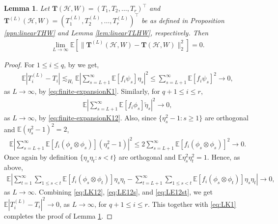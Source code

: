 \documentclass[11pt,reqno]{amsart}
\numberwithin{equation}{section}
\newcommand{\cH}{{\mathcal H}}
\newtheorem{lemma}{Lemma}[section]
\theoremstyle{definition}
\begin{document}
\begin{lemma}\label{lemma:Z_N-convg} 
Let $\bm T(\cH, W) = (T_1, T_2, \ldots, T_r)^\top$ and $\bm T^{(L)}(\cH, W) =  (T_1^{(L)}, T_2^{(L)}, \ldots, T_r^{(L)})^\top$ be as defined in Proposition \ref{ppn:linearTHW} and Lemma \ref{lem:linearTLHW}, respectively. Then 
\begin{align*}
    \lim_{L \rightarrow \infty} \mathbb E \left[ \| \bm T^{(L)}(\cH, W) - \bm T(\cH, W) \|_2^2 \right] = 0. 
\end{align*}
\end{lemma} 

\begin{proof} 

For $1\leq i\leq q$, by \cite[Lemma 8]{laxfunctional} we get,
\begin{align}\label{eq:LK1}
\mathbb E |T_i^{(L)} - T_i| \lesssim_{H_i} \mathbb E \left|\sum_{s = L+1}^{\infty}\mathbb{E}\left[f_{i}\psi_{s}\right] \eta_{s}\right|^{2} \leq \sum_{s=L+1}^\infty \mathbb{E}\left[f_{i}\psi_{s}\right]^2 \rightarrow 0 , 
\end{align}
as $L \rightarrow \infty$, by \eqref{eq:finite-expansionK1}. Similarly, for $q+1\leq i\leq r$,
\begin{align}\label{eq:LK12}
    \mathbb E \left|\sum_{s = L+1}^\infty \mathbb{E}\left[f_{i}\phi_{s}\right] \tilde{\eta}_{s} \right|^{2} \rightarrow 0 , 
\end{align} 
as $L \rightarrow \infty$, by \eqref{eq:finite-expansionK12}. Also,
since $\{\eta_{s}^2-1: s\geq 1\}$ are orthogonal and $\mathbb{E}(\eta_{s}^2-1)^2=2$,
\begin{align}\label{eq:LE12s}
  \mathbb E \left|\sum_{ s = L+1}^\infty \mathbb{E}\left[f_{i}(\phi_{s}\otimes\phi_{s})\right]\left(\eta_{s}^2 - 1\right)\right|^2 \leq  2\sum_{s= L+1}^\infty \mathbb{E}\left[f_{i}(\phi_{s}\otimes\phi_{s})\right]^2 \rightarrow 0 . 
\end{align} 
Once again by definition $\{\eta_{s}\eta_{t}: s < t\}$ are orthogonal and $\mathbb{E}\eta_{s}^2\eta_{t}^2=1$. Hence, as above, 
\begin{align}\label{eq:LE12st}
    \mathbb E \left| \sum_{t=1}^\infty \sum_{1 \leq s < t }\mathbb{E}\left[f_{i}(\phi_{s}\otimes\phi_{t})\right]\eta_{s}\eta_{t}  -  \sum_{t = L+1}^\infty \sum_{1 \leq s < t} \mathbb{E}\left[f_{i}(\phi_{s}\otimes\phi_{t})\right]\eta_{s}\eta_{t} \right| \rightarrow 0 , 
\end{align} 
as $L \rightarrow \infty$. Combining \eqref{eq:LK12}, \eqref{eq:LE12s}, and \eqref{eq:LE12st}, we get $\mathbb E |T_i^{(L)} - T_i|^2 \rightarrow 0$, as $L \rightarrow \infty$, for $q+1 \leq i \leq r$. This together with \eqref{eq:LK1} completes the proof of Lemma \ref{lemma:Z_N-convg}.
\end{proof}
\end{document}
